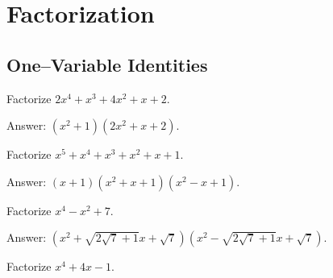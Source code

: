 \section{Factorization}

\subsection{One--Variable Identities}


\begin{tcolorbox}
\begin{question}
Factorize $2x^4 + x^3 + 4x^2 + x + 2$.
\end{question}
\end{tcolorbox}

\begin{solution}[name=Solution by Parviz Shahriari]
Answer: $(x^2+1)(2x^2+x+2)$.
\end{solution}




\begin{tcolorbox}
\begin{question}
Factorize $x^5+x^4+x^3+x^2+x+1$.
\end{question}
\end{tcolorbox}

\begin{solution}[name=Solution by Parviz Shahriari]
Answer: $(x+1)(x^2+x+1)(x^2-x+1)$.
\end{solution}



\begin{tcolorbox}
\begin{question}
Factorize $x^4-x^2+7$.
\end{question}
\end{tcolorbox}

\begin{solution}[name=Solution by Parviz Shahriari]
Answer: $(x^2+\sqrt{2\sqrt{7}+1}x + \sqrt{7})(x^2-\sqrt{2\sqrt{7}+1}x + \sqrt{7})$.
\end{solution}


\begin{tcolorbox}
\begin{question}
Factorize $x^4+4x-1$.
\end{question}
\end{tcolorbox}

